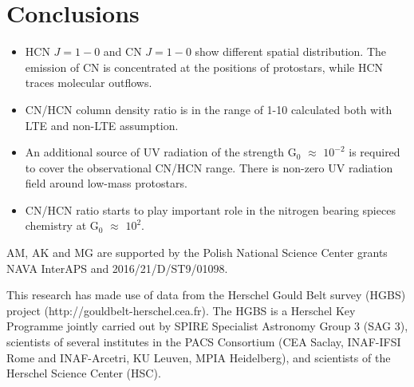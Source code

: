 \documentclass{aa}
\begin{document}
\section{Conclusions}

\begin{itemize}
\item HCN $J=1-0$ and CN $J=1-0$ show different spatial distribution. The emission of CN is concentrated at the positions of protostars, while HCN traces molecular outflows. 
\item CN/HCN column density ratio is in the range of 1-10 calculated both with LTE and non-LTE assumption.
\item An additional source of UV radiation of the strength G$_0$ $\approx$ $10^{-2}$ is required to cover the observational CN/HCN range. There is non-zero UV radiation field around low-mass protostars.
\item CN/HCN ratio starts to play important role in the nitrogen bearing spieces chemistry at G$_0$ $\approx$ $10^{2}$.
\end{itemize}



\begin{acknowledgements}
AM, AK and MG are supported by the Polish National Science Center grants NAVA InterAPS and 2016/21/D/ST9/01098. 

This research has made use of data from the Herschel Gould Belt survey (HGBS) project (http://gouldbelt-herschel.cea.fr). The HGBS is a Herschel Key Programme jointly carried out by SPIRE Specialist Astronomy Group 3 (SAG 3), scientists of several institutes in the PACS Consortium (CEA Saclay, INAF-IFSI Rome and INAF-Arcetri, KU Leuven, MPIA Heidelberg), and scientists of the Herschel Science Center (HSC).
\end{acknowledgements}


%
%
\end{document}
